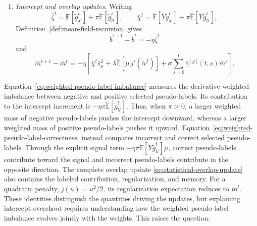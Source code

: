 \begin{proposition}
\begin{enumerate}[label=(\roman*),wide]
    \item \emph{Intercept and overlap updates.}
    Writing
    \[
        \bar\zeta^t
        =
        \tilde{\mathbb E}[\tilde g_{\mathcal L}^t]
        +
        \pi\tilde{\mathbb E}[\tilde g_{\mathcal U}^t],
        \qquad
        \bar\chi^t
        =
        \tilde{\mathbb E}[\tilde Y\tilde g_{\mathcal L}^t]
        +
        \pi\tilde{\mathbb E}[\tilde Y\tilde g_{\mathcal U}^t],
    \]
    Definition~\ref{def:mean-field-recursion} gives
    \begin{equation}
        \bar b^{t+1}-\bar b^t
        =
        -\eta\bar\zeta^t
        \label{eq:statistical-intercept-drift}
    \end{equation}
    and
    \begin{equation}
        \bar m^{t+1}-\bar m^t
        =
        -\eta\left[
            \bar\chi^t\bar s_\mu^2
            +
            \lambda
            \tilde{\mathbb E}
                [\tilde\mu\,j'(\tilde w^t)]
            +
            \sigma
            \sum_{s=0}^{t}
                \bar\gamma^{[g]}(t,s)\bar m^s
        \right].
        \label{eq:statistical-overlap-update}
    \end{equation}
\end{enumerate}
\end{proposition}

Equation~\eqref{eq:weighted-pseudo-label-imbalance}
measures the derivative-weighted imbalance between negative
and positive selected pseudo-labels.
Its contribution to the intercept increment is
$-\eta\pi\tilde{\mathbb E}[\tilde g_{\mathcal U}^t]$.
Thus, when $\pi>0$, a larger weighted mass of negative
pseudo-labels pushes the intercept downward, whereas a larger
weighted mass of positive pseudo-labels pushes it upward.
Equation~\eqref{eq:weighted-pseudo-label-correctness}
instead compares incorrect and correct selected pseudo-labels.
Through the explicit signal term
$-\eta\pi\tilde{\mathbb E}
[\tilde Y\tilde g_{\mathcal U}^t]\tilde\mu$,
correct pseudo-labels contribute toward the signal and
incorrect pseudo-labels contribute in the opposite direction.
The complete overlap update
\eqref{eq:statistical-overlap-update} also contains the labeled
contribution, regularization, and memory.
For a quadratic penalty, $j(u)=u^2/2$, its regularization
expectation reduces to $\bar m^t$.
These identities distinguish the quantities driving the updates,
but explaining intercept overshoot requires understanding
how the weighted pseudo-label imbalance evolves jointly
with the weights.
This raises the question:

